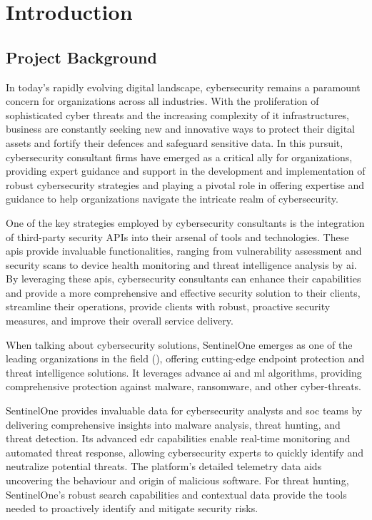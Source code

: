 \chapter{Introduction}

\section{Project Background}

In today's rapidly evolving digital landscape, cybersecurity remains a paramount concern for organizations
across all industries. With the proliferation of sophisticated cyber threats and the increasing complexity of
\acrshort{it} infrastructures, business are constantly seeking new and innovative ways to protect their
digital assets and fortify their defences and safeguard sensitive data. In this pursuit, cybersecurity
consultant firms have emerged as a critical ally for organizations, providing expert guidance and support in
the development and implementation of robust cybersecurity strategies and playing a pivotal role in offering
expertise and guidance to help organizations navigate the intricate realm of cybersecurity.

One of the key strategies employed by cybersecurity consultants is the integration of third-party security
\gls{API}s into their arsenal of tools and technologies. These \acrshort{api}s provide invaluable
functionalities, ranging from vulnerability assessment and security scans to device health monitoring and
threat intelligence analysis by \acrshort{ai}. By leveraging these \acrshort{api}s, cybersecurity consultants
can enhance their capabilities and provide a more comprehensive and effective security solution to their
clients, streamline their operations, provide clients with robust, proactive security measures, and improve
their overall service delivery.

When talking about cybersecurity solutions, SentinelOne emerges as one of the leading organizations in the field
(\textit{\cite{gartnerEDR}}), offering cutting-edge endpoint protection and threat intelligence solutions. It leverages advance
\acrshort{ai} and \acrshort{ml} algorithms, providing comprehensive protection against malware, ransomware, and other cyber-threats.

SentinelOne provides invaluable data for cybersecurity analysts and \acrshort{soc} teams by delivering comprehensive insights into
malware analysis, threat hunting, and threat detection. Its advanced \acrshort{edr} capabilities enable real-time monitoring and
automated threat response, allowing cybersecurity experts to quickly identify and neutralize potential threats. The platform's
detailed telemetry data aids uncovering the behaviour and origin of malicious software. For threat hunting, SentinelOne's robust
search capabilities and contextual data provide the tools needed to proactively identify and mitigate security risks.

